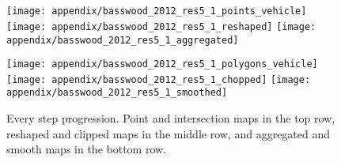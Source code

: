 
\appendixtitle 
\appendix

\unappendixtitle
\singleappendixtitle

\chapter{}

\begin{figure}
    \centering
    \begin{minipage}{0.49\textwidth}
        \centering
        \texttt{[image: appendix/basswood\_2012\_res5\_1\_points\_vehicle]}
        \texttt{[image: appendix/basswood\_2012\_res5\_1\_reshaped]}
        \texttt{[image: appendix/basswood\_2012\_res5\_1\_aggregated]}
    \end{minipage}\hfill
    \begin{minipage}{0.49\textwidth}
        \centering
        \texttt{[image: appendix/basswood\_2012\_res5\_1\_polygons\_vehicle]}
        \texttt{[image: appendix/basswood\_2012\_res5\_1\_chopped]}
        \texttt{[image: appendix/basswood\_2012\_res5\_1\_smoothed]}
    \end{minipage}
    \caption[Step-by-step visualization of the algorithm for one field]{Every step progression. Point and intersection maps
      in the top row, reshaped and clipped maps in the middle row, and
    aggregated and smooth maps in the bottom row.}
    \label{fig:basswood2012-all-steps}
\end{figure}

